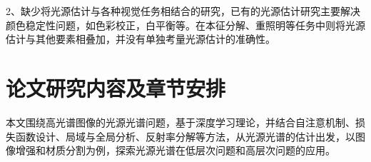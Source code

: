 \documentclass[
    type = master, %
    degree = academic,        %
    decl-page,  %
  ]{njuthesis}
\begin{document}

2、缺少将光源估计与各种视觉任务相结合的研究，已有的光源估计研究主要解决颜色稳定性问题，如色彩校正，白平衡等。在本征分解、重照明等任务中则将光源估计与其他要素相叠加，并没有单独考量光源估计的准确性。

\section{论文研究内容及章节安排}
本文围绕高光谱图像的光源光谱问题，基于深度学习理论，并结合自注意机制、损失函数设计、局域与全局分析、反射率分解等方法，从光源光谱的估计出发，以图像增强和材质分割为例，探索光源光谱在低层次问题和高层次问题的应用。



\end{document}
